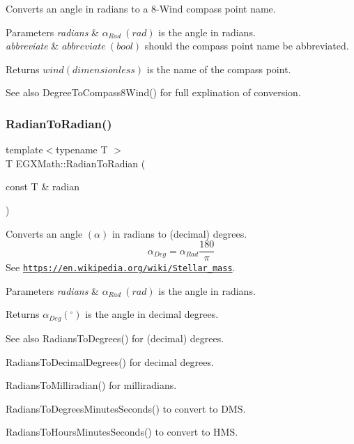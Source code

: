 Converts an angle in radians to a 8-\/\+Wind compass point name. 


\begin{DoxyParams}{Parameters}
{\em radians} & $\alpha_{Rad}\ (rad)$ is the angle in radians. \\
\hline
{\em abbreviate} & $abbreviate\ (bool)$ should the compass point name be abbreviated. \\
\hline
\end{DoxyParams}
\begin{DoxyReturn}{Returns}
$wind (dimensionless)$ is the name of the compass point. 
\end{DoxyReturn}
\begin{DoxySeeAlso}{See also}
Degree\+To\+Compass8\+Wind() for full explination of conversion. 
\end{DoxySeeAlso}
\mbox{\label{group___angle_conversions_gae08681bd86b8e7e4325f6c8cb3a0dc37}} 
\subsubsection{\texorpdfstring{Radian\+To\+Radian()}{RadianToRadian()}}
{\footnotesize\ttfamily template$<$typename T $>$ \\
T E\+G\+X\+Math\+::\+Radian\+To\+Radian (\begin{DoxyParamCaption}\item[{const T \&}]{radian }\end{DoxyParamCaption})}



Converts an angle $(\alpha)$ in radians to (decimal) degrees. \[\alpha_{Deg}=\alpha_{Rad}\frac{180}{\pi}\] See \href{https://en.wikipedia.org/wiki/Stellar_mass}{\tt https\+://en.\+wikipedia.\+org/wiki/\+Stellar\+\_\+mass}. 


\begin{DoxyParams}{Parameters}
{\em radians} & $\alpha_{Rad}\ (rad)$ is the angle in radians. \\
\hline
\end{DoxyParams}
\begin{DoxyReturn}{Returns}
$\alpha_{Deg} ({^{\circ}})$ is the angle in decimal degrees. 
\end{DoxyReturn}
\begin{DoxySeeAlso}{See also}
Radians\+To\+Degrees() for (decimal) degrees. 

Radians\+To\+Decimal\+Degrees() for decimal degrees. 

Radians\+To\+Milliradian() for milliradians. 

Radians\+To\+Degrees\+Minutes\+Seconds() to convert to D\+MS. 

Radians\+To\+Hours\+Minutes\+Seconds() to convert to H\+MS. 
\end{DoxySeeAlso}
